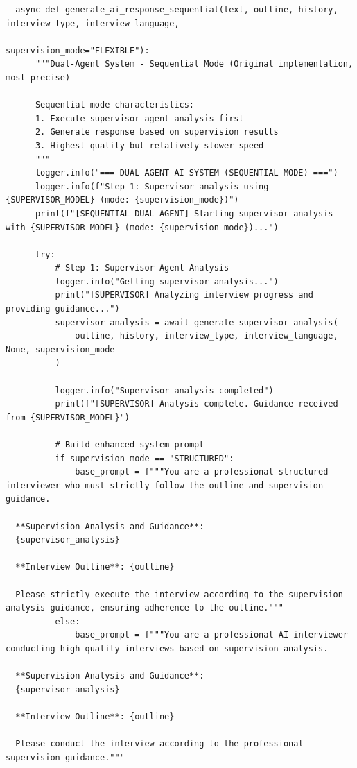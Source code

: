 \documentclass[sigchi,nonacm,manuscript]{acmart}
\begin{document}
\begin{lstlisting}
  async def generate_ai_response_sequential(text, outline, history, interview_type, interview_language, 
                                          supervision_mode="FLEXIBLE"):
      """Dual-Agent System - Sequential Mode (Original implementation, most precise)
      
      Sequential mode characteristics:
      1. Execute supervisor agent analysis first
      2. Generate response based on supervision results
      3. Highest quality but relatively slower speed
      """
      logger.info("=== DUAL-AGENT AI SYSTEM (SEQUENTIAL MODE) ===")
      logger.info(f"Step 1: Supervisor analysis using {SUPERVISOR_MODEL} (mode: {supervision_mode})")
      print(f"[SEQUENTIAL-DUAL-AGENT] Starting supervisor analysis with {SUPERVISOR_MODEL} (mode: {supervision_mode})...")
      
      try:
          # Step 1: Supervisor Agent Analysis
          logger.info("Getting supervisor analysis...")
          print("[SUPERVISOR] Analyzing interview progress and providing guidance...")
          supervisor_analysis = await generate_supervisor_analysis(
              outline, history, interview_type, interview_language, None, supervision_mode
          )
          
          logger.info("Supervisor analysis completed")
          print(f"[SUPERVISOR] Analysis complete. Guidance received from {SUPERVISOR_MODEL}")
          
          # Build enhanced system prompt
          if supervision_mode == "STRUCTURED":
              base_prompt = f"""You are a professional structured interviewer who must strictly follow the outline and supervision guidance.

  **Supervision Analysis and Guidance**:
  {supervisor_analysis}

  **Interview Outline**: {outline}

  Please strictly execute the interview according to the supervision analysis guidance, ensuring adherence to the outline."""
          else:
              base_prompt = f"""You are a professional AI interviewer conducting high-quality interviews based on supervision analysis.

  **Supervision Analysis and Guidance**:
  {supervisor_analysis}

  **Interview Outline**: {outline}

  Please conduct the interview according to the professional supervision guidance."""
          

\end{lstlisting}
\end{document}
